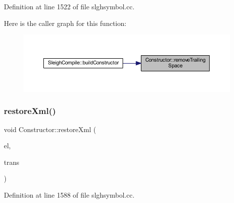 Definition at line 1522 of file slghsymbol.\+cc.

Here is the caller graph for this function\+:
\nopagebreak
\begin{figure}[H]
\begin{center}
\leavevmode
\includegraphics[width=350pt]{class_constructor_a4b6a4cd00ebf6d0e76f770e917e5ff72_icgraph}
\end{center}
\end{figure}
\mbox{\label{class_constructor_a67b635e452e41499c9962aaad9406781}} 
\subsubsection{\texorpdfstring{restoreXml()}{restoreXml()}}
{\footnotesize\ttfamily void Constructor\+::restore\+Xml (\begin{DoxyParamCaption}\item[{const \mbox{\hyperlink{class_element}{Element}} $\ast$}]{el,  }\item[{\mbox{\hyperlink{class_sleigh_base}{Sleigh\+Base}} $\ast$}]{trans }\end{DoxyParamCaption})}



Definition at line 1588 of file slghsymbol.\+cc.

